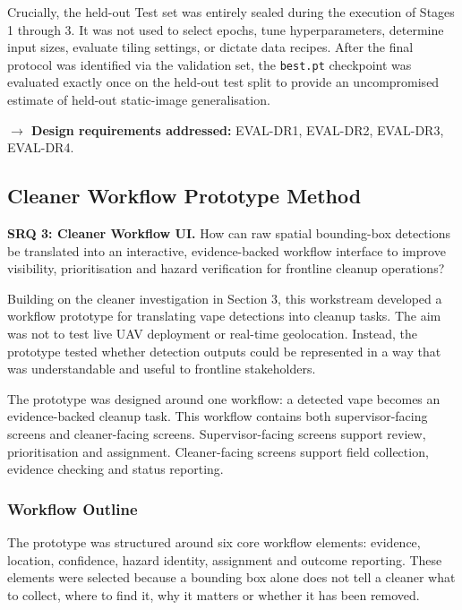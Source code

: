 Crucially, the held-out Test set was entirely sealed during the execution of Stages 1 through 3. It was not used to select epochs, tune hyperparameters, determine input sizes, evaluate tiling settings, or dictate data recipes. After the final protocol was identified via the validation set, the \texttt{best.pt} checkpoint was evaluated exactly once on the held-out test split to provide an uncompromised estimate of held-out static-image generalisation.

\vspace{0.5em}
\noindent\textbf{$\rightarrow$ Design requirements addressed:} EVAL-DR1, EVAL-DR2, EVAL-DR3, EVAL-DR4.
\subsection{Cleaner Workflow Prototype Method}

\textbf{SRQ 3: Cleaner Workflow UI.} How can raw spatial bounding-box detections be translated into an interactive, evidence-backed workflow interface to improve visibility, prioritisation and hazard verification for frontline cleanup operations?

Building on the cleaner investigation in Section 3, this workstream developed a workflow prototype for translating vape detections into cleanup tasks. The aim was not to test live UAV deployment or real-time geolocation. Instead, the prototype tested whether detection outputs could be represented in a way that was understandable and useful to frontline stakeholders.

The prototype was designed around one workflow: a detected vape becomes an evidence-backed cleanup task. This workflow contains both supervisor-facing screens and cleaner-facing screens. Supervisor-facing screens support review, prioritisation and assignment. Cleaner-facing screens support field collection, evidence checking and status reporting.

\subsubsection{Workflow Outline}

The prototype was structured around six core workflow elements: evidence, location, confidence, hazard identity, assignment and outcome reporting. These elements were selected because a bounding box alone does not tell a cleaner what to collect, where to find it, why it matters or whether it has been removed.


